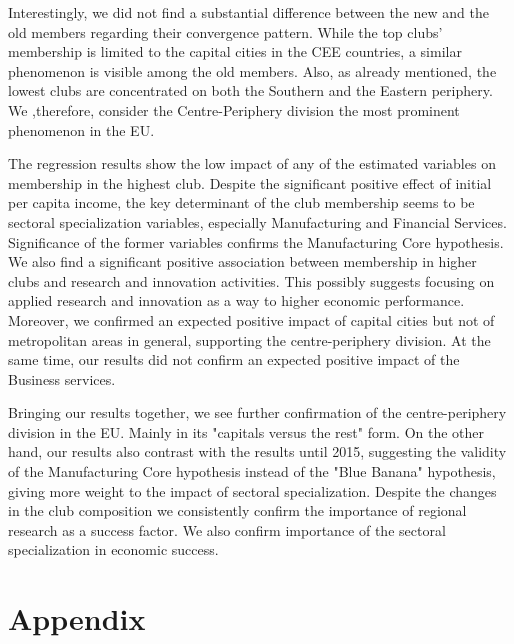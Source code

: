 \documentclass[11pt]{article}
\begin{document}
Interestingly, we did not find a substantial difference between the new and the old members regarding their convergence pattern. While the top clubs' membership is limited to the capital cities in the CEE countries, a similar phenomenon is visible among the old members. Also, as already mentioned, the lowest clubs are concentrated on both the Southern and the Eastern periphery. We ,therefore, consider the Centre-Periphery division the most prominent phenomenon in the EU.

The regression results show the low impact of any of the estimated variables on membership in the highest club. Despite the significant positive effect of initial per capita income, the key determinant of the club membership seems to be sectoral specialization variables, especially Manufacturing and Financial Services. Significance of the former variables confirms the Manufacturing Core hypothesis. We also find a significant positive association between membership in higher clubs and research and innovation activities. This possibly suggests focusing on applied research and innovation as a way to higher economic performance. Moreover, we confirmed an expected positive impact of capital cities but not of metropolitan areas in general, supporting the centre-periphery division. At the same time, our results did not confirm an expected positive impact of the Business services.
 
 
Bringing our results together, we see further confirmation of the centre-periphery division in the EU. Mainly in its "capitals versus the rest" form. On the other hand, our results also contrast with the results until 2015, suggesting the validity of the Manufacturing Core hypothesis instead of the "Blue Banana" hypothesis, giving more weight to the impact of sectoral specialization. Despite the changes in the club composition we consistently confirm the importance of regional research as a success factor. We also confirm importance of the sectoral specialization in economic success.



\newpage



\section{Appendix}
\end{document}
